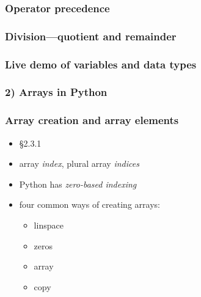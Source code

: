 \documentclass[14pt]{beamer}
\newcommand\red[1]{{\color{red} #1}}
\begin{document}

\begin{frame}[fragile]

\frametitle{Operator precedence}

\end{frame}


\begin{frame}[fragile]

\frametitle{Division---quotient and remainder}

\end{frame}


\begin{frame}[fragile]
\frametitle{Live demo of variables and data types}

\end{frame}


\begin{frame}[fragile]

\frametitle{2) Arrays in Python}

\end{frame}


\begin{frame}[fragile]

\frametitle{Array creation and array elements}

\begin{itemize}
	\item \red{\S2.3.1}
	\item array \red{\emph{index}}, plural array \red{\emph{indices}}
	\item Python has \red{\emph{zero-based indexing}}
	\item four common ways of creating arrays:
	\begin{itemize}
		\item linspace
		\item zeros
		\item array
		\item copy
	\end{itemize}
\end{itemize}

\end{frame}
\end{document}
